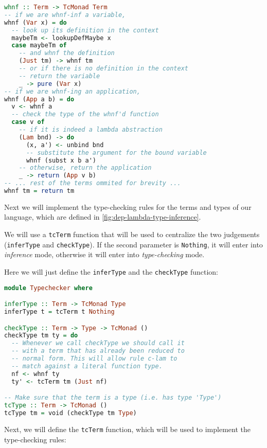 \documentclass[12pt]{article}
\theoremstyle{definition}
\newcommand{\code}[1]{\texttt{#1}}
\begin{document}
\begin{lstlisting}[language=Haskell]
whnf :: Term -> TcMonad Term
-- if we are whnf-inf a variable,
whnf (Var x) = do
  -- look up its definition in the context
  maybeTm <- lookupDefMaybe x
  case maybeTm of
    -- and whnf the definition
    (Just tm) -> whnf tm
    -- or if there is no definition in the context
    -- return the variable 
    _ -> pure (Var x)
-- if we are whnf-ing an application,
whnf (App a b) = do
  v <- whnf a
  -- check the type of the whnf'd function
  case v of
    -- if it is indeed a lambda abstraction
    (Lam bnd) -> do
      (x, a') <- unbind bnd
      -- substitute the argument for the bound variable
      whnf (subst x b a')
    -- otherwise, return the application
    _ -> return (App v b)
-- ... rest of the terms ommited for brevity ...
whnf tm = return tm
\end{lstlisting}


Next we will implement the type-checking rules for the terms and types of our language, which are defined in \autoref{fig:dep-lambda-type-inference}.

We will use a \code{tcTerm} function that will be used to centralize the two judgements (\code{inferType} and \code{checkType}). If the second parameter is \code{Nothing}, it will enter into \emph{inference} mode, otherwise it will enter into \emph{type-checking} mode.

Here we will just define the \code{inferType} and the \code{checkType} function:

\begin{lstlisting}[language=Haskell]
module Typechecker where

inferType :: Term -> TcMonad Type
inferType t = tcTerm t Nothing

checkType :: Term -> Type -> TcMonad ()
checkType tm ty = do
  -- Whenever we call checkType we should call it
  -- with a term that has already been reduced to 
  -- normal form. This will allow rule c-lam to
  -- match against a literal function type.
  nf <- whnf ty
  ty' <- tcTerm tm (Just nf)

-- Make sure that the term is a type (i.e. has type 'Type')
tcType :: Term -> TcMonad ()
tcType tm = void (checkType tm Type)
\end{lstlisting}

Next, we will define the \code{tcTerm} function, which will be used to implement the type-checking rules:
\end{document}
